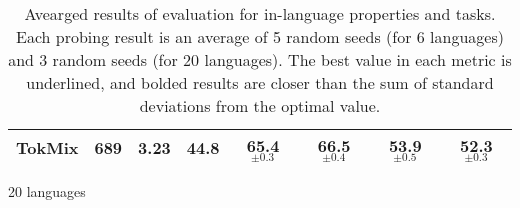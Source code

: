 \begin{table*}[!htb]
\begin{subtable}{1\linewidth}
\begin{tabular}{lccccccc}
    TokMix    &       689 &  3.23 &  44.8 &  65.4 $_{\pm0.3}$ &  \bf{66.5} $_{\pm0.4}$ &  \bf{53.9} $_{\pm0.5}$ &  \bf{52.3} $_{\pm0.3}$ \\
    \bottomrule
    \end{tabular}
    \caption{20 languages}
    \label{tab:in_lang_avg_20l}
\end{subtable} 
\caption{Avearged results of evaluation for in-language properties and tasks. Each probing result is an average of 5 random seeds (for 6 languages) and 3 random seeds (for 20 languages). The best value in each metric is underlined, and bolded results are closer than the sum of standard deviations from the optimal value.}
\end{table*}